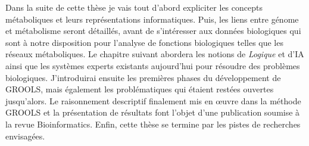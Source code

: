 \begin{refsegment}

Dans la suite de cette thèse je vais tout d’abord expliciter les concepts métaboliques et leurs représentations informatiques. Puis, les liens entre génome et métabolisme seront détaillés, avant de s'intéresser aux données biologiques qui sont à notre disposition pour l’analyse de fonctions biologiques telles que les réseaux métaboliques. Le chapitre suivant abordera les notions de \textit{Logique} et d'\gls{IA} ainsi que les systèmes experts existants aujourd'hui pour résoudre des problèmes biologiques. J'introduirai ensuite les premières phases du développement de \gls{GROOLS}, mais également les problématiques qui étaient restées ouvertes jusqu'alors. Le raisonnement descriptif finalement mis en œuvre dans la méthode \gls{GROOLS} et la présentation de résultats font l’objet d’une publication soumise à la revue Bioinformatics. Enfin, cette thèse se termine par les pistes de recherches envisagées.



\end{refsegment}